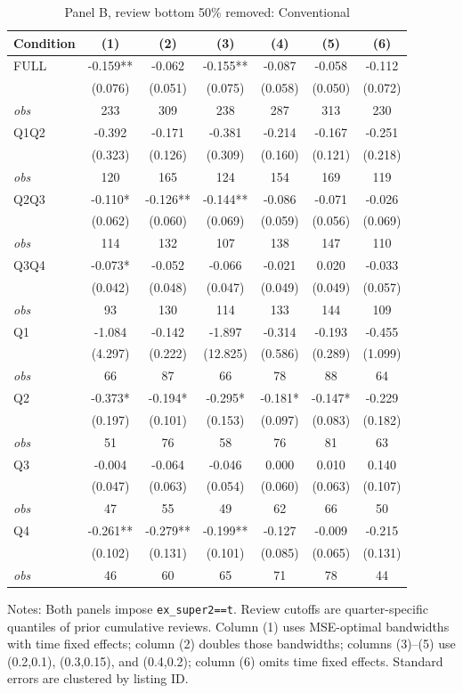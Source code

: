 \begin{table}[!htbp]
\centering
\caption{Panel B, review bottom 50\% removed: Conventional}
\begin{tabular}{lcccccc}
\toprule
Condition & (1) & (2) & (3) & (4) & (5) & (6) \\
\midrule
FULL & -0.159** & -0.062 & -0.155** & -0.087 & -0.058 & -0.112 \\
 & (0.076) & (0.051) & (0.075) & (0.058) & (0.050) & (0.072) \\
\textit{obs} & 233 & 309 & 238 & 287 & 313 & 230 \\
Q1Q2 & -0.392 & -0.171 & -0.381 & -0.214 & -0.167 & -0.251 \\
 & (0.323) & (0.126) & (0.309) & (0.160) & (0.121) & (0.218) \\
\textit{obs} & 120 & 165 & 124 & 154 & 169 & 119 \\
Q2Q3 & -0.110* & -0.126** & -0.144** & -0.086 & -0.071 & -0.026 \\
 & (0.062) & (0.060) & (0.069) & (0.059) & (0.056) & (0.069) \\
\textit{obs} & 114 & 132 & 107 & 138 & 147 & 110 \\
Q3Q4 & -0.073* & -0.052 & -0.066 & -0.021 & 0.020 & -0.033 \\
 & (0.042) & (0.048) & (0.047) & (0.049) & (0.049) & (0.057) \\
\textit{obs} & 93 & 130 & 114 & 133 & 144 & 109 \\
Q1 & -1.084 & -0.142 & -1.897 & -0.314 & -0.193 & -0.455 \\
 & (4.297) & (0.222) & (12.825) & (0.586) & (0.289) & (1.099) \\
\textit{obs} & 66 & 87 & 66 & 78 & 88 & 64 \\
Q2 & -0.373* & -0.194* & -0.295* & -0.181* & -0.147* & -0.229 \\
 & (0.197) & (0.101) & (0.153) & (0.097) & (0.083) & (0.182) \\
\textit{obs} & 51 & 76 & 58 & 76 & 81 & 63 \\
Q3 & -0.004 & -0.064 & -0.046 & 0.000 & 0.010 & 0.140 \\
 & (0.047) & (0.063) & (0.054) & (0.060) & (0.063) & (0.107) \\
\textit{obs} & 47 & 55 & 49 & 62 & 66 & 50 \\
Q4 & -0.261** & -0.279** & -0.199** & -0.127 & -0.009 & -0.215 \\
 & (0.102) & (0.131) & (0.101) & (0.085) & (0.065) & (0.131) \\
\textit{obs} & 46 & 60 & 65 & 71 & 78 & 44 \\
\bottomrule
\end{tabular}
\begin{minipage}{0.98\textwidth}\footnotesize
Notes: Both panels impose \texttt{ex\_super2==t}. Review cutoffs are quarter-specific quantiles of prior cumulative reviews. Column (1) uses MSE-optimal bandwidths with time fixed effects; column (2) doubles those bandwidths; columns (3)--(5) use (0.2,0.1), (0.3,0.15), and (0.4,0.2); column (6) omits time fixed effects. Standard errors are clustered by listing ID.
\end{minipage}
\end{table}


